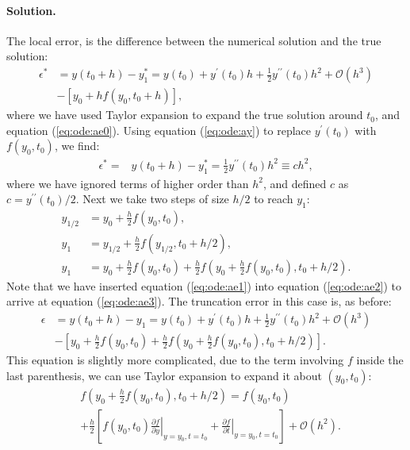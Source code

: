 \documentclass[graybox,sectrefs,envcountresetchap,open=right,final]{svmonodo}
\newenvironment{doconceexercise}{}{}
\begin{document}
\begin{doconceexercise}
\paragraph{Solution.}
The local error, is the difference between the numerical solution and the true solution:
\begin{align}
\epsilon^*&=y(t_0+h)-y_{1}^*=y(t_0)+y^{\prime}(t_0)h+\frac{1}{2}y^{\prime\prime}(t_0)h^2+\mathcal{O}(h^3)\nonumber\\ 
&-\left[y_0+hf(y_0,t_0+h)\right],
\end{align}
where we have used Taylor expansion to expand the true solution around $t_0$, and equation (\ref{eq:ode:ae0}).
Using equation (\ref{eq:ode:ay}) to replace $y^\prime(t_0)$ with $f(y_0,t_0)$, we find:
\begin{align}
\epsilon^*=&y(t_0+h)-y_{1}^*=\frac{1}{2}y^{\prime\prime}(t_0)h^2\equiv ch^2,
\end{align}
where we have ignored terms of higher order than $h^2$, and defined $c$ as $c=y^{\prime\prime}(t_0)/2$. Next we take two steps of size $h/2$ to
reach $y_1$:  
\begin{align}
y_{1/2}&=y_0+\frac{h}{2}f(y_0,t_0),\label{eq:ode:ae1}\\ 
y_{1}&=y_{1/2}+\frac{h}{2}f(y_{1/2},t_0+h/2),\label{eq:ode:ae2}\\ 
y_{1}&=y_{0}+\frac{h}{2}f(y_0,t_0)+\frac{h}{2}f(y_0+\frac{h}{2}f(y_0,t_0),t_0+h/2).\label{eq:ode:ae3}
\end{align}
Note that we have inserted
equation (\ref{eq:ode:ae1}) into equation (\ref{eq:ode:ae2}) to arrive at equation (\ref{eq:ode:ae3}). The truncation error in this case is, as before:
\begin{align}
\epsilon&=y(t_0+h)-y_{1}=y(t_0)+y^{\prime}(t_0)h+\frac{1}{2}y^{\prime\prime}(t_0)h^2+\mathcal{O}(h^3)\nonumber\\ 
&-\left[y_{0}+\frac{h}{2}f(y_0,t_0)+\frac{h}{2}f(y_0+\frac{h}{2}f(y_0,t_0),t_0+h/2)\right].\label{eq:ode:ay5}
\end{align}
This equation is slightly more complicated, due to the term involving $f$ inside the last parenthesis, we can use Taylor expansion to expand it about $(y_0,t_0)$:
\begin{align}
&f(y_0+\frac{h}{2}f(y_0,t_0),t_0+h/2)=f(y_0,t_0)\nonumber\\ 
&+\frac{h}{2}\left[f(y_0,t_0)\left.\frac{\partial f}{\partial y}\right|_{y=y_0,t=t_0}
+\left.\frac{\partial f}{\partial t}\right|_{y=y_0,t=t_0}\right]+\mathcal{O}(h^2).\label{eq:ode:ay2}
\end{align}

\end{doconceexercise}
\end{document}
